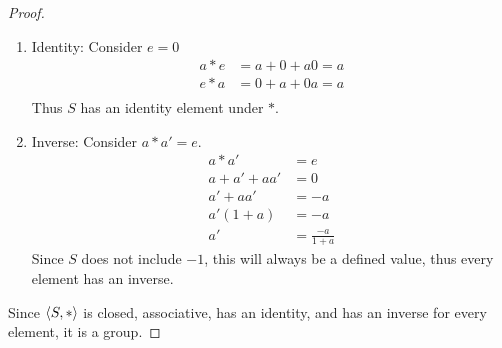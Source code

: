 \documentclass{article}
\begin{document}
\begin{enumerate}
{\begin{enumerate}
{\begin{proof}
\begin{enumerate}
\begin{align*}
                            & = a + (b+c+bc) + a(b+c+bc) \\
                            & = a+b+c+bc+ab+ac+abc \\ \\
                            (a*b)*c & = (a+b+ab)*c \\
                            & = (a+b+ab) + c + (a+b+ab)c \\
                            & = a+b+c+ab+ac+bc+abc
                        \end{align*}
                        Thus $*$ is associative for $S$.
                        \item Identity: Consider $e = 0$
                        \begin{align*}
                            a * e & = a + 0 + a0 = a \\
                            e * a & = 0 + a + 0a = a \\
                        \end{align*}
                        Thus $S$ has an identity element under $*$.
                        \item Inverse: Consider $a*a'=e$.
                        \begin{align*}
                            a*a' & = e \\
                            a + a' + aa' & = 0 \\
                            a' + aa' & = -a \\
                            a'(1+a) & = -a \\
                            a' & = \frac{-a}{1+a}
                        \end{align*}
                        Since $S$ does not include $-1$, this will always be a defined value, thus every element has an inverse.
                    \end{enumerate}
                    Since $\langle S, * \rangle$ is closed, associative, has an identity, and has an inverse for every element, it is a group.
                \end{proof}
            }
        \end{enumerate}
    }
\end{enumerate}
\end{document}
